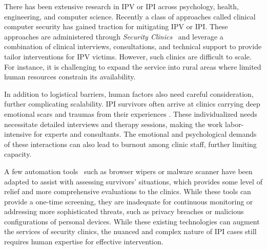 
There has been extensive research in IPV or IPI across psychology, health, engineering, and computer science. Recently a class of approaches called clinical computer security\cite{havron2019clinical,tseng2022care} has gained traction for mitigating IPV or IPI. These approaches are administered through \textit{Security Clinics}~\cite{bellini2024abusive, tseng2022care, havron2019clinical} and leverage a combination of clinical interviews, consultations, and technical support to provide tailor interventions for IPV victims. However, such clinics are difficult to scale. For instance, it is challenging to expand the service into rural areas where limited human resources constrain its availability. %

In addition to logistical barriers, human factors also need careful consideration, further complicating scalability. IPI survivors often arrive at clinics carrying deep emotional scars and traumas from their experiences \cite{ramjit2024navigating}. These individualized needs necessitate detailed interviews and therapy sessions, making the work labor-intensive for experts and consultants. The emotional and psychological demands of these interactions can also lead to burnout among clinic staff, further limiting capacity.

A few automation tools~\cite{arief2014sensible} such as browser wipers or malware scanner have been adapted to assist with assessing survivors’ situations, which provides some level of relief and more comprehensive evaluations to the clinics. While these tools can provide a one-time screening, they are inadequate for continuous monitoring or addressing more sophisticated threats, such as privacy breaches or malicious configurations of personal devices. While these existing technologies can augment the services of security clinics, the nuanced and complex nature of IPI cases still requires human expertise for effective intervention.


